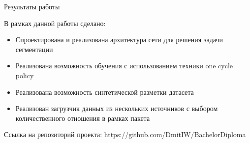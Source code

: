 
\begin{frame}{Результаты работы}
\begin{block}{}
    В рамках данной работы сделано:
\begin{itemize}
    \item Спроектирована и реализована архитектура сети для решения задачи сегментации
    \item Реализована возможность обучения с использованием техники one cycle policy
    \item Реализована возможность синтетической разметки датасета
    \item Реализован загрузчик данных из нескольких источников с выбором количественного отношения в рамках пакета
\end{itemize}
    Ссылка на репозиторий проекта: https://github.com/DmitIW/BachelorDiploma
\end{block}
\end{frame}